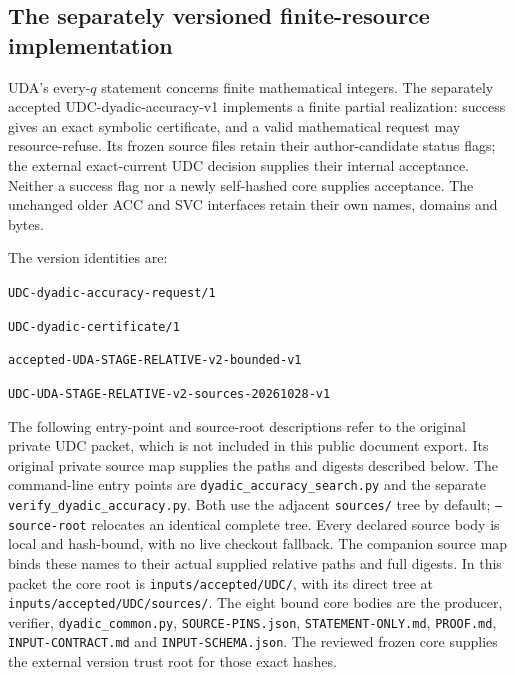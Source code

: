 \subsection{The separately versioned finite-resource implementation}
\label{udc:contract}
UDA's every-$q$ statement concerns finite mathematical integers. The
separately accepted UDC-dyadic-accuracy-v1 implements a finite partial
realization: success gives an exact symbolic certificate, and a valid
mathematical request may resource-refuse. Its frozen source files retain
their author-candidate status flags; the external exact-current UDC decision
supplies their internal acceptance. Neither a success flag nor a newly
self-hashed core supplies acceptance. The unchanged older ACC and SVC
interfaces retain their own names, domains and bytes.

The version identities are:
\begin{description}[leftmargin=1em,style=nextline,itemsep=0.1em]
\item[Request] \nolinkurl{UDC-dyadic-accuracy-request/1}
\item[Certificate] \nolinkurl{UDC-dyadic-certificate/1}
\item[Backend] \nolinkurl{accepted-UDA-STAGE-RELATIVE-v2-bounded-v1}
\item[Source bundle] \nolinkurl{UDC-UDA-STAGE-RELATIVE-v2-sources-20261028-v1}
\end{description}
The following entry-point and source-root descriptions refer to the original
private UDC packet, which is not included in this public document export.
Its original private source map supplies the paths and digests described below.
The command-line entry points are \nolinkurl{dyadic_accuracy_search.py} and
the separate \nolinkurl{verify_dyadic_accuracy.py}. Both use the adjacent \texttt{sources/}
tree by default; \texttt{--source-root} relocates an identical complete
tree. Every declared source body is local and hash-bound, with no live
checkout fallback. The companion source map binds these names to their
actual supplied relative paths and full digests.
In this packet the core root is \nolinkurl{inputs/accepted/UDC/}, with its
direct tree at \nolinkurl{inputs/accepted/UDC/sources/}. The eight bound core
bodies are the producer, verifier, \nolinkurl{dyadic_common.py},
\nolinkurl{SOURCE-PINS.json}, \nolinkurl{STATEMENT-ONLY.md},
\nolinkurl{PROOF.md}, \nolinkurl{INPUT-CONTRACT.md} and
\nolinkurl{INPUT-SCHEMA.json}. The reviewed frozen core supplies the external
version trust root for those exact hashes.

